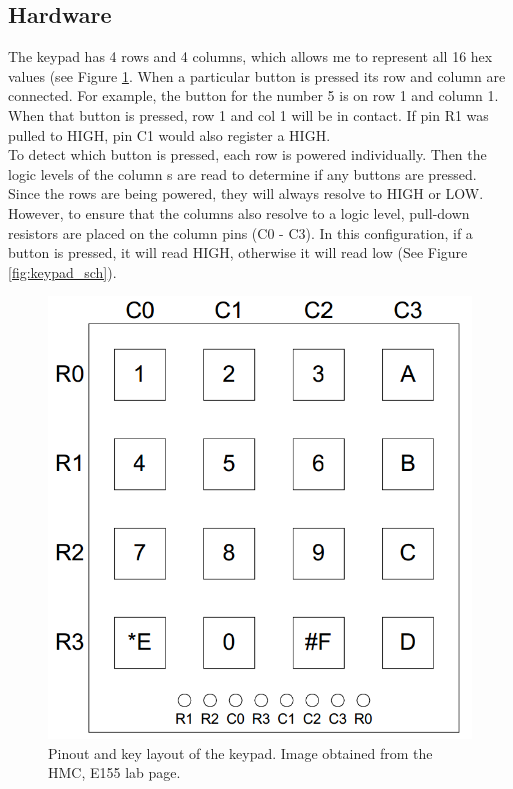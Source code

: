 \documentclass[11pt]{article}
\begin{document}
\subsection{Hardware}

The keypad has 4 rows and 4 columns, which allows me to represent all 16 hex values (see Figure \ref{fig:keypad_pinout}. When a particular button is pressed its row and column are connected. For example, the button for the number 5 is on row 1 and column 1. When that button is pressed, row 1 and col 1 will be in contact. If pin R1 was pulled to HIGH, pin C1 would also register a HIGH. \\

To detect which button is pressed, each row is powered individually. Then the logic levels of the column s are read to determine if any buttons are pressed. Since the rows are being powered, they will always resolve to HIGH or LOW. However, to ensure that the columns also resolve to a logic level, pull-down resistors are placed on the column pins (C0 - C3). In this configuration, if a button is pressed, it will read HIGH, otherwise it will read low (See Figure \ref{fig:keypad_sch}). \\


\begin{figure}[h!]
\centering
\includegraphics[scale=0.35]{keypad_pinout.png}
\caption{Pinout and key layout of the keypad. Image obtained from the HMC, E155 lab page.}
\label{fig:keypad_pinout}
\end{figure} 
\end{document}
